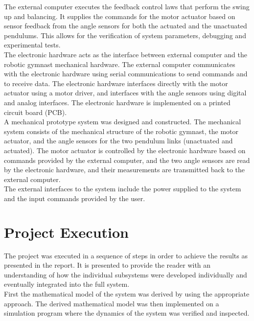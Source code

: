 The external computer executes the feedback control laws that perform the swing up and balancing. It supplies the commands for the motor actuator based on sensor feedback from the angle sensors for both the actuated and the unactuated pendulums. This allows for the verification of system parameters, debugging and experimental tests.\\

The electronic hardware acts as the interface between external computer and the robotic gymnast mechanical hardware. The external computer communicates with the electronic hardware using serial communications to send commands and to receive data. The electronic hardware interfaces directly with the motor actuator using a motor driver, and interfaces with the angle sensors using digital and analog interfaces. The electronic hardware is implemented on a printed circuit board (PCB).\\

A mechanical prototype system was designed and constructed. The mechanical system consists of the mechanical structure of the robotic gymnast, the motor actuator, and the angle sensors for the two pendulum links (unactuated and actuated). The motor actuator is controlled by the electronic hardware based on commands provided by the external computer, and the two angle sensors are read by the electronic hardware, and their measurements are transmitted back to the external computer.\\

The external interfaces to the system include the power supplied to the system and the input commands provided by the user.

\section{Project Execution}

The project was executed in a sequence of steps in order to achieve the results as presented in the report. It is presented to provide the reader with an understanding of how the individual subsystems were developed individually and eventually integrated into the full system.\\
 
First the mathematical model of the system was derived by using the appropriate approach. The derived mathematical model was then implemented on a simulation program where the dynamics of the system was verified and inspected.\\

